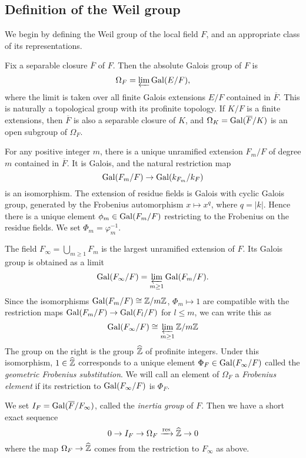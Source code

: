\subsection{Definition of the Weil group}
We begin by defining the Weil group of the local field $F$, and an appropriate class of its representations.

Fix a separable closure $\overline{F}$ of $F$. Then the absolute Galois group of $F$ is
\[\Omega_F = \varprojlim\mathrm{Gal}(E/F),\]
where the limit is taken over all finite Galois extensions $E/F$ contained in $\overline{F}$. This is naturally a topological group with its profinite topology. If $K/F$ is a finite extensions, then $\overline{F}$ is also a separable closure of $K$, and $\Omega_K = \mathrm{Gal}(\overline{F}/K)$ is an open subgroup of $\Omega_F$.

For any positive integer $m$, there is a unique unramified extension $F_m/F$ of degree $m$ contained in $\overline{F}$. It is Galois, and the natural restriction map
\[\mathrm{Gal}(F_m/F)\to \mathrm{Gal}(k_{F_m}/k_F)\]
is an isomorphism. The extension of residue fields is Galois with cyclic Galois group, generated by the Frobenius automorphism $x\mapsto x^q$, where $q = |k|$. Hence there is a unique element $\phi_m\in \mathrm{Gal}(F_m/F)$ restricting to the Frobenius on the residue fields. We set $\Phi_m = \varphi_m^{-1}$.

The field $F_\infty = \bigcup_{m\ge1} F_m$ is the largest unramified extension of $F$. Its Galois group is obtained as a limit
\[\mathrm{Gal}(F_\infty/F) = \varprojlim_{m\ge 1}\mathrm{Gal}(F_m/F).\]
Since the isomorphisms $\mathrm{Gal}(F_m/F)\cong \mathbb{Z}/m\mathbb{Z}$, $\Phi_m\mapsto 1$ are compatible with the restriction maps $\mathrm{Gal}(F_m/F)\to\mathrm{Gal}(F_l/F)$ for $l\le m$, we can write this as
\[\mathrm{Gal}(F_\infty/F)\cong \varprojlim_{m\ge 1} \mathbb{Z}/m\mathbb{Z}\]
The group on the right is the group $\widehat{\mathbb{Z}}$ of profinite integers. Under this isomorphism, $1\in \widehat{\mathbb{Z}}$ corresponds to a unique element $\Phi_F\in \mathrm{Gal}(F_\infty/F)$ called the \emph{geometric Frobenius substitution}. We will call an element of $\Omega_F$ a \emph{Frobenius element} if its restriction to $\mathrm{Gal}(F_\infty/F)$ is $\Phi_F$. 

We set $I_F = \mathrm{Gal}(\overline{F}/F_\infty)$, called the \emph{inertia group} of $F$. Then we have a short exact sequence
\[0 \to I_F\to \Omega_F \xrightarrow{\text{res}} \widehat{\mathbb{Z}}\to 0\]
where the map $\Omega_F\to \widehat{\mathbb{Z}}$ comes from the restriction to $F_\infty$ as above.

